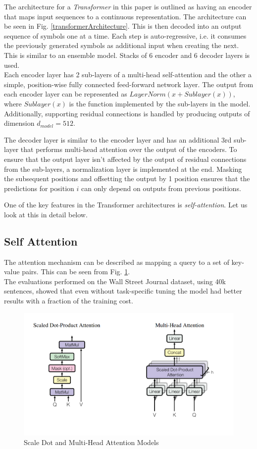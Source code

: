 \documentclass[12pt]{report}
\begin{document}
			The architecture for a \textit{Transformer} in this paper is outlined as having an encoder that maps input sequences to a continuous representation. The architecture can be seen in Fig. \ref{transformerArchitecture}. This is then decoded into an output sequence of symbols one at a time. Each step is auto-regressive, i.e. it consumes the previously generated symbols as additional input when creating the next. This is similar to an ensemble model. Stacks of 6 encoder and 6 decoder layers is used.\\
			Each encoder layer has 2 sub-layers of a multi-head self-attention and the other a simple, position-wise fully connected feed-forward network layer. The output from each encoder layer can be represented as $  LayerNorm(x + Sublayer(x)) $, where $ Sublayer(x) $ is the function implemented by the sub-layers in the model. Additionally, supporting residual connections is handled by producing outputs of dimension $ d_{model}=512 $.

			The decoder layer is similar to the encoder layer and has an additional 3rd sub-layer that performs multi-head attention over the output of the encoders. To ensure that the output layer isn't affected by the output of residual connections from the sub-layers, a normalization layer is implemented at the end. Masking the subsequent positions and offsetting the output by 1 position ensures that the predictions for position $ i $ can only depend on outputs from previous positions.

			One of the key features in the Transformer architectures is \textit{self-attention}. Let us look at this in detail below.
			\subsection{Self Attention}\label{231}
			The attention mechanism can be described as mapping a query to a set of key-value pairs. This can be seen from Fig. \ref{multiHeadAttention}. \\The evaluations performed on the Wall Street Journal dataset\citep{wsj}, using 40k sentences, showed that even without task-specific tuning the model had better results with a fraction of the training cost.
			\begin{figure}[h!]
				\centering
				\includegraphics[scale=0.4]{../images/multihead.png}
				\caption{Scale Dot and Multi-Head Attention Models \cite{atayl}}\label{multiHeadAttention}
			\end{figure}
\end{document}
